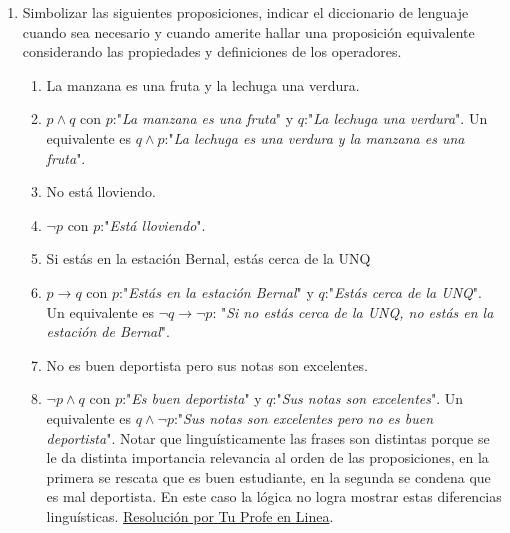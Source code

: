 \documentclass[a4paper]{article}
\newcommand{\answer}{\item[**]}
\newcommand{\exercise}{\item}
\newcommand{\then}{\to}
\begin{document}
\begin{enumerate}
\begin{multicols}{2}
\begin{enumerate} [label=(\alph*)]
		\item $x+4$ 
		\answer No es proposición. Se puede leer como "El número $x$ más 4" y no se afirma nada al respecto. Es similar al inciso de "En las aulas de la UNQ".

		\item $x^2-4$ no tiene raíces reales 
		\answer Función afirmativa, es una proposición. Para averiguar su valor de verdad debemos buscar las raíces de la parábola, es decir, $x^2-4=0$. Mediante la fórmula de Bhaskara (la resolvente cuadrática) podemos obtener que $x=2$ o $x=-2$. $2$ y $-2$ son números reales. Por lo que la proposición es falsa. 

	\end{enumerate}
	\end{multicols}

	\exercise Simbolizar las siguientes proposiciones, indicar el diccionario de lenguaje cuando sea necesario y cuando amerite hallar una proposición equivalente considerando las propiedades y definiciones de los operadores.
	\begin{multicols}{2}
	\begin{enumerate} [label=(\alph*)]

		\item La manzana es una fruta y la lechuga una verdura. 
		\answer $p \land q$ con $p$:"\textit{La manzana es una fruta}" y $q$:"\textit{La lechuga una verdura}". Un equivalente es $q \land p$:"\textit{La lechuga es una verdura y la manzana es una fruta}".

		\item No está lloviendo. 
		\answer $\neg p$ con $p$:"\textit{Está lloviendo}".

		\item Si estás en la estación Bernal, estás cerca de la UNQ 
		\answer $p\then q$ con $p$:"\textit{Estás en la estación Bernal}" y $q$:"\textit{Estás cerca de la UNQ}". Un equivalente es $\neg q \then \neg p$: "\textit{Si no estás cerca de la UNQ, no estás en la estación de Bernal}".

		\item No es buen deportista pero sus notas son excelentes.
		\answer $\neg p \land q$ con $p$:"\textit{Es buen deportista}" y $q$:"\textit{Sus notas son excelentes}". Un equivalente es $q \land \neg p$:"\textit{Sus notas son excelentes pero no es buen deportista}". Notar que linguísticamente las frases son distintas porque se le da distinta importancia relevancia al orden de las proposiciones, en la primera se rescata que es buen estudiante, en la segunda se condena que es mal deportista. En este caso la lógica no logra mostrar estas diferencias linguísticas. \href{https://youtu.be/HXzyX5XGPp8?t=503}{Resolución por Tu Profe en Linea}.


\end{enumerate}
\end{multicols}
\end{enumerate}
\end{document}
